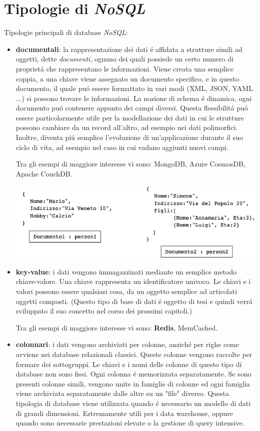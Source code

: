 \section{Tipologie di \emph{NoSQL}}
Tipologie principali di database \emph{NoSQL}:
\begin{itemize}
    \item \textbf{documentali}: la rappresentazione dei dati é affidata a strutture simili ad oggetti, dette \emph{documenti}, ognuno dei
    quali possiede un certo numero di proprietá che rappresentano le informazioni.
    Viene creata una semplice coppia, a una chiave viene assegnato un documento specifico, e in questo documento, il quale puó essere
    formattato in vari modi (XML, JSON, YAML ...) si possono trovare le informazioni.
    La nozione di schema é dinamica, ogni documento puó contenere appunto dei campi diversi. Questa flessibilitá puó essere particolarmente
    utile per la modellazione dei dati in cui le strutture possono cambiare da un record all'altro, ad esempio nei dati polimorfici.
    Inoltre, diventa piú semplice l'evoluzione di un'applicazione durante il suo ciclo di vita, ad esempio nel caso in cui vadano aggiunti nuovi
    campi.

    Tra gli esempi di maggiore interesse vi sono: MongoDB, Azure CosmosDB, Apache CouchDB.

    \includegraphics[width=1\textwidth]{img/dbDocumentale}

    \item \textbf{key-value}: i dati vengono immagazzinati mediante un semplice metodo chiave-valore. Una chiave rappresenta un identificatore
    univoco. Le chiavi e i valori possono essere qualsiasi cosa, da un oggetto semplice ad articolati oggetti composti.
    (Questo tipo di base di dati é oggetto di tesi e quindi verrá sviluppato il suo concetto nel corso dei prossimi capitoli.)

    Tra gli esempi di maggiore interesse vi sono: \textbf{Redis}, MemCached.
    \item \textbf{colonnari}: i dati vengono archiviati per colonne, anziché per righe come avviene nei database relazionali classici.
    Queste colonne vengono raccolte per formare dei sottogruppi. Le chiavi e i nomi delle colonne di questo tipo di database non sono fissi.
    Ogni colonna é memorizzata separatamente. Se sono presenti colonne simili, vengono unite in famiglie di colonne ed ogni famiglia
    viene archiviata separatamente dalle altre su un "file" diverso.
    Questa tipologia di database viene utilizzata quando é necessario un modello di dati di grandi dimensioni. Estremamente utili
    per i data warehouse, oppure quando sono necessarie prestazioni elevate o la gestione di query intensive.


\end{itemize}
